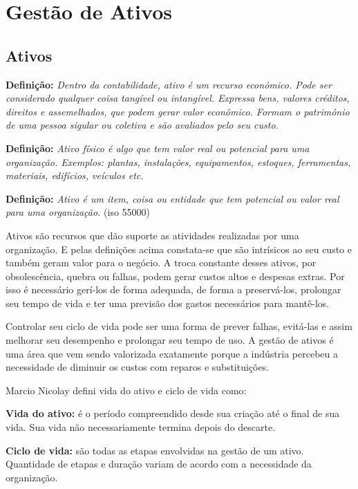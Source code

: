 \chapter{Gestão de Ativos}
\label{cap-ativos}

\section{Ativos}

\textbf{Definição:} \emph{Dentro da contabilidade, ativo é um recurso econômico. Pode ser considerado qualquer coisa tangível ou intangível. Expressa bens, valores créditos, direitos e assemelhados, que podem gerar valor econômico. Formam o patrimônio de uma pessoa sigular ou coletiva e são avaliados pelo seu custo.} \cite{sullivan2003}\cite{fulgencio2007} 

\textbf{Definição:} \emph{Ativo físico é algo que tem valor real ou potencial para uma organização.
Exemplos: plantas, instalações, equipamentos, estoques, ferramentas, materiais, edifícios, veículos etc.} \cite{nicolay2015}

\textbf{Definição:} \emph{Ativo é um item, coisa ou entidade que tem potencial ou valor real para uma organização.} (iso 55000)

Ativos são recursos que dão suporte as atividades realizadas por uma organização. E pelas definições acima constata-se que são intrísicos ao seu custo e também geram valor para o negócio. A troca constante desses ativos, por obsolescência, quebra ou falhas, podem gerar custos altos e despesas extras. Por isso é necessário gerí-los de forma adequada, de forma a preservá-los, prolongar seu tempo de vida e ter uma previsão dos gastos necessários para mantê-los. 

Controlar seu ciclo de vida pode ser uma forma de prever falhas, evitá-las e assim melhorar seu desempenho e prolongar seu tempo de uso. A gestão de ativos é uma área que vem sendo valorizada exatamente porque a indústria percebeu a necessidade de diminuir os custos com reparos e substituições.

Marcio Nicolay \cite{nicolay2015} defini vida do ativo e ciclo de vida como:

\textbf{Vida do ativo:} é o período compreendido desde sua criação até o final de sua vida. Sua vida não necessariamente termina depois do descarte.

\textbf{Ciclo de vida:} são todas as etapas envolvidas na gestão de um ativo. Quantidade de etapas e duração variam de acordo com a necessidade da organização.

